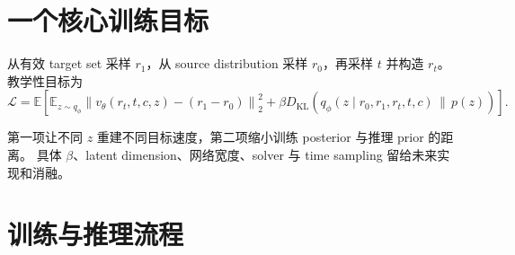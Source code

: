 \documentclass[UTF8,a4paper,11pt]{ctexart}
\begin{document}
\section{一个核心训练目标}

从有效 target set 采样 $r_1$，从 source distribution 采样 $r_0$，再采样 $t$ 并构造
$r_t$。教学性目标为
\begin{equation}
\boxed{
\mathcal L=
\mathbb E\!\left[
\mathbb E_{z\sim q_\phi}
\left\|v_\theta(r_t,t,c,z)-(r_1-r_0)\right\|_2^2
+\beta D_{\mathrm{KL}}\!\left(
q_\phi(z\mid r_0,r_1,r_t,t,c)\,\|\,p(z)\right)
\right].}
\label{eq:vrfm-objective}
\end{equation}

第一项让不同 $z$ 重建不同目标速度，第二项缩小训练 posterior 与推理 prior 的距离。
具体 $\beta$、latent dimension、网络宽度、solver 与 time sampling 留给未来实现和消融。

\section{训练与推理流程}
\end{document}
